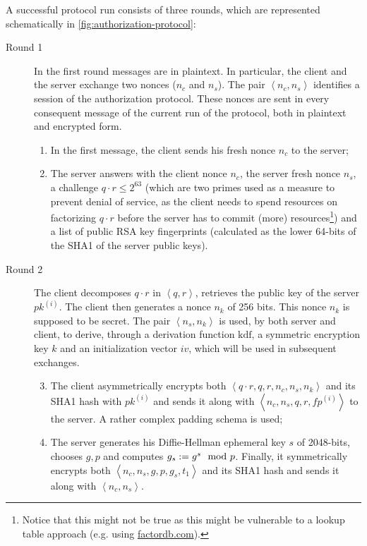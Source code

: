 A successful protocol run consists of three rounds, which are represented schematically in \cref{fig:authorization-protocol}:
\begin{description}
    \item[Round 1] In the first round messages are in plaintext. In particular, the client and the server exchange two nonces ($n_c$ and $n_s$). The pair $\left<n_c, n_s\right>$ identifies a session of the authorization protocol. These nonces are sent in every consequent message of the current run of the protocol, both in plaintext and encrypted form.
        \begin{enumerate}
            \item{In the first message, the client sends his fresh nonce $n_c$ to the server;}
            \item{The server answers with the client nonce $n_c$, the server fresh nonce $n_s$, a challenge $q \cdot r \leq 2^{63}$ (which are two primes used as a measure to prevent denial of service, as the client needs to spend resources on factorizing $q \cdot r$ before the server has to commit (more) resources\footnote{Notice that this might not be true as this might be vulnerable to a lookup table approach (e.g. using \href{http://factordb.com}{factordb.com}).}) and a list of public RSA key fingerprints (calculated as the lower 64-bits of the SHA1 of the server public keys).}
        \end{enumerate}

    \item[Round 2] The client decomposes $q\cdot r$ in $\left<q, r\right>$, retrieves the public key of the server $pk^{\left(i\right)}$. The client then generates a nonce $n_k$ of 256 bits. This nonce $n_k$ is supposed to be secret. The pair $\left<n_s, n_k\right>$ is used, by both server and client, to derive, through a derivation function $\mbox{kdf}$, a symmetric encryption key $k$ and an initialization vector $iv$, which will be used in subsequent exchanges.
        \begin{enumerate}
            \setcounter{enumi}{2}
            \item{The client asymmetrically encrypts both $\left<q\cdot r, q, r, n_c, n_s, n_k\right>$ and its SHA1 hash with $pk^{(i)}$ and sends it along with $\left<n_c, n_s, q, r, fp^{(i)}\right>$ to the server. A rather complex padding schema is used;}
            \item{The server generates his Diffie-Hellman ephemeral key $s$ of 2048-bits, chooses $g, p$ and computes $g_s:= g^s \mod{p}$. Finally, it symmetrically encrypts both $\left<n_c, n_s, g, p, g_s, t_1\right>$ and its SHA1 hash and sends it along with $\left<n_c, n_s\right>$.}
        \end{enumerate}


\end{description}
